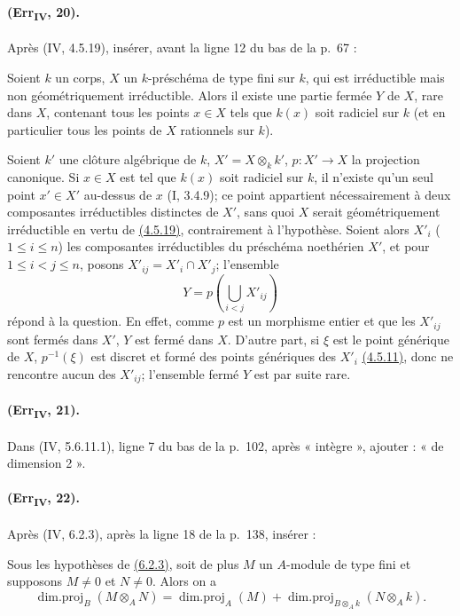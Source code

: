 \paragraph{(Err\textsubscript{IV}, 20).}
Après (IV, 4.5.19), insérer, avant la ligne 12 du bas de la p.~67 :

\begin{corollary}[4.5.19.3]
\label{IV.4.5.19.3}
Soient $k$ un corps, $X$ un $k$-préschéma de type fini sur $k$, qui est
irréductible mais non géométriquement irréductible. Alors il existe une
partie fermée $Y$ de $X$, rare dans $X$, contenant tous les points
$x\in X$ tels que $k(x)$ soit radiciel sur $k$ (et en particulier tous
les points de $X$ rationnels sur $k$).
\end{corollary}

Soient $k'$ une clôture algébrique de $k$, $X'=X\otimes_kk'$,
$p:X'\to X$ la projection canonique. Si $x\in X$ est tel que $k(x)$
soit radiciel sur $k$, il n'existe qu'un seul point $x'\in X'$ au-dessus
de $x$ (I, 3.4.9); ce point appartient nécessairement à deux composantes
irréductibles distinctes de $X'$, sans quoi $X$ serait géométriquement
irréductible en vertu de
{\hyperlink{ega4.c04.prop.4-5-19}{(4.5.19)}}, contrairement à
l'hypothèse. Soient alors $X'_i$ ($1\leq i\leq n$) les composantes
irréductibles du préschéma noethérien $X'$, et pour
$1\leq i<j\leq n$, posons $X'_{ij}=X'_i\cap X'_j$; l'ensemble
\[
 Y=p\left(\bigcup_{i<j}X'_{ij}\right)
\]
répond à la question. En effet, comme $p$ est un morphisme entier et
que les $X'_{ij}$ sont fermés dans $X'$, $Y$ est fermé dans $X$.
D'autre part, si $\xi$ est le point générique de $X$, $p^{-1}(\xi)$
est discret et formé des points génériques des $X'_i$
{\hyperlink{ega4.c04.cor.4-5-11}{(4.5.11)}}, donc ne rencontre aucun
des $X'_{ij}$; l'ensemble fermé $Y$ est par suite rare.

\paragraph{(Err\textsubscript{IV}, 21).}
Dans (IV, 5.6.11.1), ligne 7 du bas de la p.~102, après « intègre »,
ajouter : « de dimension 2 ».

\paragraph{(Err\textsubscript{IV}, 22).}
Après (IV, 6.2.3), après la ligne 18 de la p.~138, insérer :

\begin{proposition}[6.2.4]
\label{IV.6.2.4}
Sous les hypothèses de {\hyperlink{ega4.c04.prop.6-2-3}{(6.2.3)}}, soit
de plus $M$ un $A$-module de type fini et supposons $M\neq0$ et
$N\neq0$. Alors on a
\begin{equation}
 \operatorname{dim.proj}_B(M\otimes_AN)=
 \operatorname{dim.proj}_A(M)+
 \operatorname{dim.proj}_{B\otimes_Ak}(N\otimes_Ak).
 \label{IV.6.2.4.1}\tag{6.2.4.1}
\end{equation}
\end{proposition}

